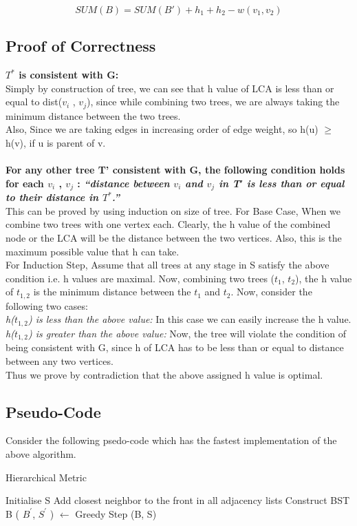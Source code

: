 \documentclass{article}
\begin{document}
$$SUM(B) = SUM(B') + h_1 + h_2- w(v_1,v_2)$$

\subsection{Proof of Correctness}
\textbf{$T^*$ is consistent with G: }\\
Simply by construction of tree, we can see that h value of LCA is less than or equal to dist($v_i$ , $v_j$), since while combining two trees, we are always taking the minimum distance between the two trees.\\

Also, Since we are taking edges in increasing order of edge weight, so h(u) $\geq$ h(v), if u is parent of v.\\ \\
\textbf{For any other tree T' consistent with G, the following condition holds for each $v_i$ , $v_j$ :
\emph{“distance between $v_i$ and $v_j$ in T′ is less than or equal to their distance in $T^*$.”}}\\ 
This can be proved by using induction on size of tree. For Base Case, When we combine two trees with one vertex each. Clearly, the h value of the combined node or the LCA will be the distance between the two vertices. Also, this is the maximum possible value that h can take. \\

For Induction Step, Assume that all trees at any stage in S satisfy the above condition i.e. h values are maximal. Now, combining two trees ($t_1$, $t_2$), the h value of $t_{1,2}$ is the minimum distance between the $t_1$ and $t_2$. Now, consider the following two cases:\\
\emph{h($t_{1,2}$) is less than the above value: }In this case we can easily increase the h value.\\
\emph{h($t_{1,2}$) is greater than the above value: } Now, the tree will violate the condition of being consistent with G, since h of LCA has to be less than or equal to distance between any two vertices.\\

Thus we prove by contradiction that the above assigned h value is optimal.

\subsection{Pseudo-Code}
Consider the following psedo-code which has the fastest implementation of the above algorithm.
\begin{algorithm}
\caption{Hierarchical Metric}
\label{hm}
\begin{algorithmic}[1]
\State Initialise S 
\State Add closest neighbor to the front in all adjacency lists  
\State Construct BST B  
  
\State ( $B^{'}$, $S^{'}$ ) $\gets$ Greedy Step (B, S)  
\EndWhile
\EndProcedure
\end{algorithmic}
\end{algorithm}
\end{document}
